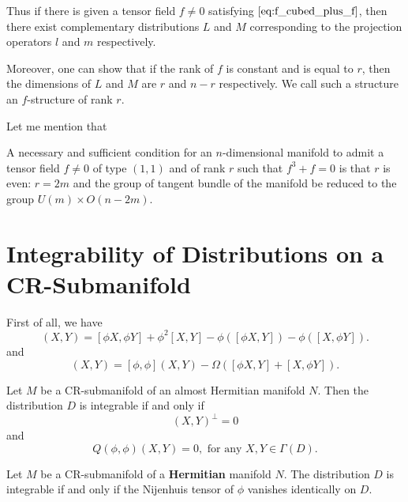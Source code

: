 \begin{remark}
    Thus if there is given a tensor field \( f \neq 0 \) satisfying $\eqref{eq:f_cubed_plus_f}$, then there exist 
complementary distributions \( L \) and \( M \) corresponding to the projection operators 
\( l \) and \( m \) respectively. 

Moreover, one can show that if the rank of \( f \) is constant and is equal to \( r \), 
then the dimensions of \( L \) and \( M \) are \( r \) and \( n-r \) respectively. We call such a structure 
an \( f \)-structure of rank \( r \).
\end{remark}

Let me mention that
\begin{theorem}
     A necessary and sufficient condition for an \( n \)-dimensional 
manifold to admit a tensor field \( f \neq 0 \) of type \( (1,1) \) and of rank \( r \) such 
that \( f^3 + f = 0 \) is that \( r \) is even: \( r = 2m \) and the group of tangent bundle 
of the manifold be reduced to the group \( U(m) \times O(n-2m) \).
\end{theorem}


\section{Integrability of Distributions on a CR-Submanifold}
First of all, we have 
\begin{equation}
    [\phi, \phi](X, Y) = [\phi X, \phi Y] + \phi^2[X, Y] - \phi([\phi X, Y]) - \phi([X, \phi Y]).
\end{equation}
and
\begin{equation}
    [J, J](X, Y) = [\phi, \phi](X, Y) - \Omega([\phi X, Y] + [X, \phi Y]).
\end{equation}

\begin{theorem}[Bejancu]
Let \( M \) be a CR-submanifold of an 
almost Hermitian manifold \( N \). Then the distribution \( D \) is 
integrable if and only if
\begin{equation}
[J, J](X, Y)^{\perp} = 0
\end{equation}
and
\begin{equation}
Q(\phi, \phi)(X, Y) = 0, \text{ for any } X, Y \in \Gamma(D).
\end{equation}
\end{theorem}

\begin{corollary}
    Let $M$ be a CR-submanifold of a \textbf{Hermitian} manifold $N$. The distribution $D$ is integrable if and only if the Nijenhuis tensor of $\phi$ vanishes identically on $D$.
\end{corollary}

